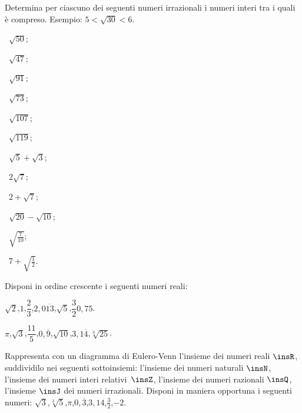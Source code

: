 \begin{esercizio}
\label{ese:1.4}
 Determina per ciascuno dei seguenti numeri irrazionali i numeri interi tra i quali è compreso. Esempio: $5<\sqrt{30}<6$.
\begin{multicols}{3}
\begin{enumeratea}
 \item~$\sqrt{50}$;
 \item~$\sqrt{47}$;
 \item~$\sqrt{91}$;
 \item~$\sqrt{73}$;
 \item~$\sqrt{107}$;
 \item~$\sqrt{119}$;
 \item~$\sqrt 5+\sqrt 3$;
 \item~$2\sqrt 7$;
 \item~$2+\sqrt 7$;
 \item~$\sqrt{20}-\sqrt{10}$;
 \item~$\sqrt{\frac 7{10}}$;
 \item~$7+\sqrt{\frac 1 2}$.
\end{enumeratea}
\end{multicols}
\end{esercizio}

\begin{esercizio}
\label{ese:1.5}
 Disponi in ordine crescente i seguenti numeri reali:
 \begin{enumeratea}
 \item $\sqrt 2$,\quad $1$,\quad $\dfrac 2 3$,\quad $2,0\overline{13}$,\quad $\sqrt 5$,\quad $\dfrac 3 2$\quad $0,75$.
 \item $\pi$,\quad $\sqrt 3$,\quad $\dfrac{11} 5$,\quad $0,\overline 9$,\quad $\sqrt{10}$,\quad $3,1\overline 4$,\quad $\sqrt[3]{25}$.
 \end{enumeratea}
\end{esercizio}

\begin{esercizio}
\label{ese:1.6}
 Rappresenta con un diagramma di Eulero-Venn l'insieme dei numeri reali $\insR$, suddividilo nei seguenti sottoinsiemi: l'insieme dei numeri naturali $\insN$, l'insieme dei numeri interi relativi~$\insZ$, l'insieme dei numeri razionali $\insQ$, l'insieme $\insJ$ dei numeri irrazionali. Disponi in maniera opportuna i seguenti numeri: $\sqrt 3$,\quad $\sqrt[3]5$,\quad$\pi$,\quad $0,\overline 3$,\quad $3,14$,\quad $\frac 3 2$,\quad$-2$.
\end{esercizio}

